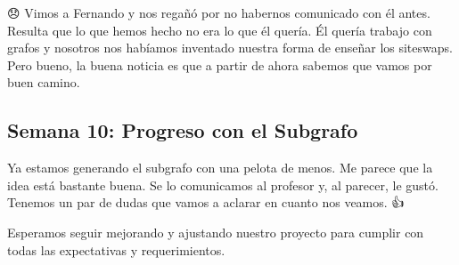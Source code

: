 \documentclass{article}
\begin{document}
😞 Vimos a Fernando y nos regañó por no habernos comunicado con él antes. Resulta que lo que hemos hecho no era lo que él quería. Él quería trabajo con grafos y nosotros nos habíamos inventado nuestra forma de enseñar los siteswaps. Pero bueno, la buena noticia es que a partir de ahora sabemos que vamos por buen camino. 💪

\subsection*{Semana 10: Progreso con el Subgrafo}

Ya estamos generando el subgrafo con una pelota de menos. Me parece que la idea está bastante buena. Se lo comunicamos al profesor y, al parecer, le gustó. Tenemos un par de dudas que vamos a aclarar en cuanto nos veamos. 👍

Esperamos seguir mejorando y ajustando nuestro proyecto para cumplir con todas las expectativas y requerimientos. 🚀
\end{document}
